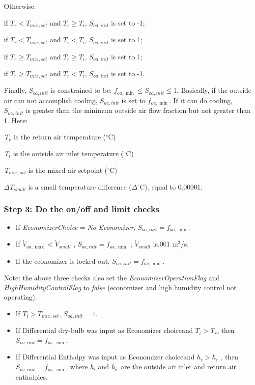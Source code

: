 Otherwise:

if \({T_r} < {T_{mix,set}}\) and \({T_r} \ge {T_i}\), \({S_{oa,init}}\) is set to -1;

if \({T_r} < {T_{mix,set}}\) and \({T_r} < {T_i}\), \({S_{oa,init}}\) is set to 1;

if \({T_r} \ge {T_{mix,set}}\) and \({T_r} \ge {T_i}\), \({S_{oa,init}}\) is set to 1;

if \({T_r} \ge {T_{mix,set}}\) and \({T_r} < {T_i}\), \({S_{oa,init}}\) is set to -1.

Finally, \({S_{oa,init}}\) is constrained to be: \({f_{oa,\min }} \le {S_{oa,init}} \le 1\). Basically, if the outside air can not accomplish cooling, \({S_{oa,init}}\) is set to \({f_{oa,\min }}\). If it can do cooling, \({S_{oa,init}}\) is greater than the minimum outside air flow fraction but not greater than 1. Here:

\emph{T\(_{r}\)} is the return air temperature (\(^{\circ}\)C)

\emph{T\(_{i}\)} is the outside air inlet temperature (\(^{\circ}\)C)

\emph{T\(_{mix,set}\)} is the mixed air setpoint (\(^{\circ}\)C)

\emph{\(\Delta {T_{small}}\)} is a small temperature difference (\(\Delta^{\circ}\)C), equal to 0.00001.

\subsubsection{Step 3: Do the on/off and limit checks}\label{step-3-Do-the-onoff-and-limit-checks}

\begin{itemize}
\item
If \emph{EconomizerChoice} = \emph{No Economizer}, \({S_{oa,init}} = {f_{oa,\min }}\).
\item
If \({\dot V_{oa,\max }} < {\dot V_{small}}\) , \({S_{oa,init}} = {f_{oa,\min }}\) ; \({\dot V_{small}}\) is.001 m\(^{3}\)/s.
\item
If the economizer is locked out, \({S_{oa,init}} = {f_{oa,\min }}\).
\end{itemize}

Note: the above three checks also set the \emph{EconomizerOperationFlag} and \emph{HighHumidityControlFlag} to \emph{false} (economizer and high humidity control not operating).

\begin{itemize}
\item If \({T_i} > {T_{mix,set}}\), \({S_{oa,init}} = 1\).
\item If Differential dry-bulb was input as Economizer choiceand \({T_i} > {T_r}\), then \({S_{oa,init}} = {f_{oa,\min }}\).
\item If Differential Enthalpy was input as Economizer choiceand \({h_i} > {h_r}\) , then \({S_{oa,init}} = {f_{oa,\min }}\), where \emph{h\(_{i}\)} and \emph{h\(_{r}\)}~are the outside air inlet and return air enthalpies.
\end{itemize}

